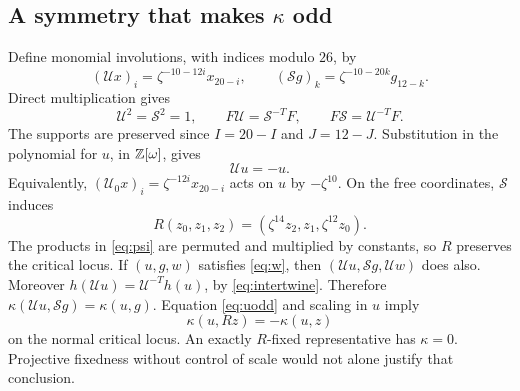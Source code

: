 \documentclass[11pt]{article}
\theoremstyle{remark}\newtheorem{remark}[theorem]{Remark}
\begin{document}
\subsection{A symmetry that makes \texorpdfstring{$\kappa$}{kappa} odd}
Define monomial involutions, with indices modulo $26$, by
\begin{equation}\label{eq:involutions}
 (\mathcal Ux)_i=\zeta^{-10-12i}x_{20-i},\qquad
 (\mathcal Sg)_k=\zeta^{-10-20k}g_{12-k}.
\end{equation}
Direct multiplication gives
\begin{equation}\label{eq:intertwine}
 \mathcal U^2=\mathcal S^2=1,\qquad
 F\mathcal U=\mathcal S^{-T}F,\qquad
 F\mathcal S=\mathcal U^{-T}F.
\end{equation}
The supports are preserved since $I=20-I$ and $J=12-J$.
Substitution in the polynomial for $u$, in $\mathbb Z[\omega]$, gives
\begin{equation}\label{eq:uodd}
 \mathcal Uu=-u.
\end{equation}
Equivalently, $(\mathcal U_0x)_i=\zeta^{-12i}x_{20-i}$ acts on $u$
by $-\zeta^{10}$. On the free coordinates, $\mathcal S$ induces
\begin{equation}\label{eq:R}
 R(z_0,z_1,z_2)=(\zeta^{14}z_2,z_1,\zeta^{12}z_0).
\end{equation}
The products in \eqref{eq:psi} are permuted and multiplied by constants,
so $R$ preserves the critical locus. If $(u,g,w)$ satisfies \eqref{eq:w},
then $(\mathcal Uu,\mathcal Sg,\mathcal Uw)$ does also. Moreover
$h(\mathcal Uu)=\mathcal U^{-T}h(u)$, by \eqref{eq:intertwine}.
Therefore $\kappa(\mathcal Uu,\mathcal Sg)=\kappa(u,g)$.
Equation \eqref{eq:uodd} and scaling in $u$ imply
\begin{equation}\label{eq:kappaodd}
 \kappa(u,Rz)=-\kappa(u,z)
\end{equation}
on the normal critical locus. An exactly $R$-fixed representative has
$\kappa=0$. Projective fixedness without control of scale would not alone
justify that conclusion.
\end{document}
